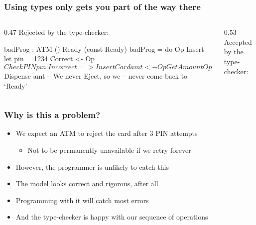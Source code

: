 \documentclass[compress,handout]{beamer}
\begin{document}
\begin{frame}[fragile]
  \frametitle{Using types only gets you part of the way there}

  \begin{columns}
  \begin{column}{0.47\framewidth}
    {\color{red} Rejected by the type-checker:}
    \vspace*{-3mm}
    \begin{idrislisting}[basicstyle=\ttfamily\scriptsize]
badProg : ATM ()
            Ready (const Ready)
badProg = do
  Op Insert
  let pin = 1234
  Correct <- Op $ CheckPIN pin
    | Incorrect => InsertCard
  amt <- Op GetAmount
  Op $ Dispense amt 
  -- We never Eject, so we
  -- never come back to
  -- `Ready'
    \end{idrislisting}
  \end{column}

  \pause  %

  \hspace*{-0.6mm}
  \vrule{}

  \begin{column}{0.53\framewidth}
    {\color{orange} Accepted by the type-checker:}
    \vspace*{-3mm}
    \vspace*{-6mm}
  \end{column}
  \end{columns}
\end{frame}


\begin{frame}
  \frametitle{Why is this a problem?}

  \begin{itemize}
    \item<1-> We expect an ATM to reject the card after 3 PIN attempts
    \begin{itemize}
      \item<1-> Not to be permanently unavailable if we retry forever
    \end{itemize}
    \item<2-> However, the programmer is unlikely to catch this
    \item<3-> The model looks correct and rigorous, after all
    \item<4-> Programming with it will catch most errors
    \item<5-> And the type-checker is happy with our sequence of operations
  \end{itemize}
\end{frame}
\end{document}
